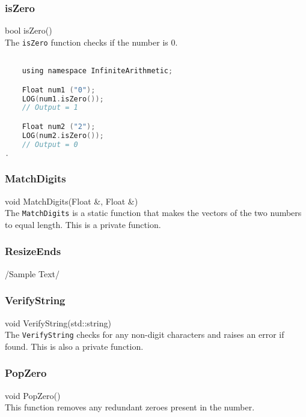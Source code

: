 \subsubsection{isZero}
{\ttfamily \large bool isZero()} \\[2mm]
The \verb|isZero| function checks if the number is $0$.
\vspace*{1em}
\begin{lstlisting}[language = C]

	using namespace InfiniteArithmetic;

	Float num1 ("0");
	LOG(num1.isZero());
	// Output = 1

	Float num2 ("2");
	LOG(num2.isZero());
	// Output = 0
.
\end{lstlisting}
\vspace*{1em}


\subsubsection{MatchDigits}
{\ttfamily \large void MatchDigits(Float \&, Float \&)} \\[2mm]
The \verb|MatchDigits| is a static function that makes the vectors of the two numbers to equal length. This is a private function.

\subsubsection{ResizeEnds}
/Sample Text/

\subsubsection{VerifyString}
{\ttfamily \large void VerifyString(std::string)} \\[2mm]
The \verb|VerifyString| checks for any non-digit characters and raises an error if found. This is also a private function.

\subsubsection{PopZero}
{\ttfamily \large void PopZero()} \\[2mm]
This function removes any redundant zeroes present in the number.


